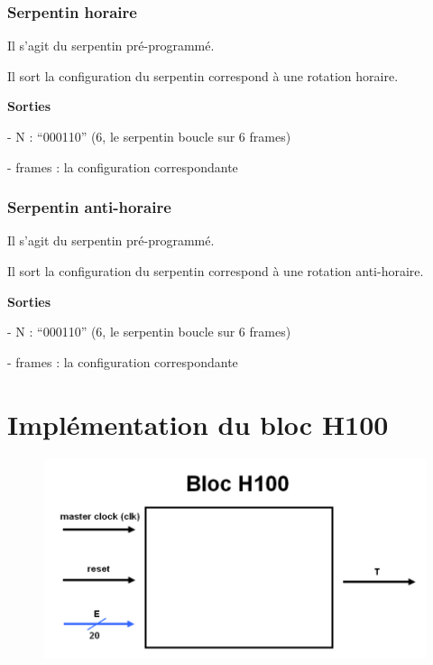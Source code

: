 \documentclass[10pt]{article}
\begin{document}
        \subsubsection{Serpentin horaire}
        
        Il s'agit du serpentin pré-programmé.
        
        Il sort la configuration du serpentin correspond à une rotation horaire.
        
        \textbf{Sorties}
            
            - N : ``000110'' (6, le serpentin boucle sur 6 frames)
            
            - frames : la configuration correspondante
                
                
        \subsubsection{Serpentin anti-horaire}
        
        Il s'agit du serpentin pré-programmé.
        
        Il sort la configuration du serpentin correspond à une rotation anti-horaire.
        
        \textbf{Sorties}
            
            - N : ``000110'' (6, le serpentin boucle sur 6 frames)
            
            - frames : la configuration correspondante
            
                
    \newpage
    \section{Implémentation du bloc H100}
    
        \begin{figure}[h!]
            \includegraphics[width=12cm]{h100.png}
            \caption{}
        \end{figure}
    
\end{document}
